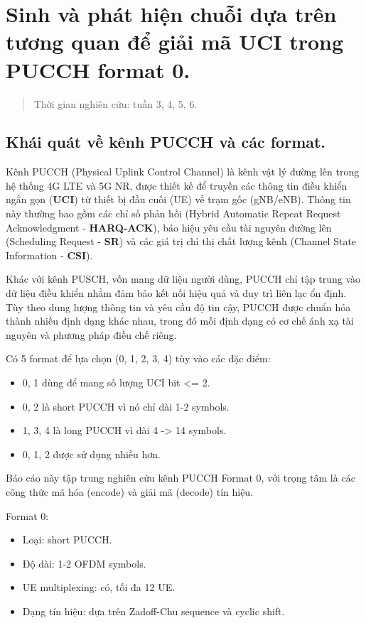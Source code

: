 \chapter{Sinh và phát hiện chuỗi dựa trên tương quan để giải mã UCI trong PUCCH format 0.}
\begin{quote}
    Thời gian nghiên cứu: tuần 3, 4, 5, 6.
\end{quote}
\section{Khái quát về kênh PUCCH và các format.}
 Kênh PUCCH (Physical Uplink Control Channel) là kênh vật lý đường lên trong hệ thống 4G LTE và 5G NR, được thiết kế để truyền các thông tin điều khiển ngắn gọn (\textbf{UCI}) từ thiết bị đầu cuối (UE) về trạm gốc (gNB/eNB). Thông tin này thường bao gồm các chỉ số phản hồi (Hybrid Automatic Repeat Request Acknowledgment - \textbf{HARQ-ACK}), báo hiệu yêu cầu tài nguyên đường lên (Scheduling Request - \textbf{SR}) và các giá trị chỉ thị chất lượng kênh (Channel State Information - \textbf{CSI}).\cite{kivijakola2024pucch}
 
 Khác với kênh PUSCH, vốn mang dữ liệu người dùng, PUCCH chỉ tập trung vào dữ liệu điều khiển nhằm đảm bảo kết nối hiệu quả và duy trì liên lạc ổn định. Tùy theo dung lượng thông tin và yêu cầu độ tin cậy, PUCCH được chuẩn hóa thành nhiều định dạng khác nhau, trong đó mỗi định dạng có cơ chế ánh xạ tài nguyên và phương pháp điều chế riêng.

 Có 5 format để lựa chọn (0, 1, 2, 3, 4) tùy vào các đặc điểm:
    \begin{itemize}
        \item 0, 1 dùng để mang số lượng  UCI bit <= 2. 
        \item 0, 2 là short PUCCH vì nó chỉ dài 1-2 symbols.
        \item 1, 3, 4 là long PUCCH vì dài 4 -> 14 symbols.
        \item 0, 1, 2 được sử dụng nhiều hơn.
\end{itemize}
Báo cáo này tập trung nghiên cứu kênh PUCCH Format 0, với trọng tâm là các công thức mã hóa (encode) và giải mã (decode) tín hiệu.  
    
    Format 0:
    \begin{itemize}
        \item Loại: short PUCCH.
        \item Độ dài: 1-2 OFDM symbols.
        \item UE multiplexing: có, tối đa 12 UE.
        \item Dạng tín hiệu: dựa trên Zadoff-Chu sequence và cyclic shift.
    \end{itemize}

